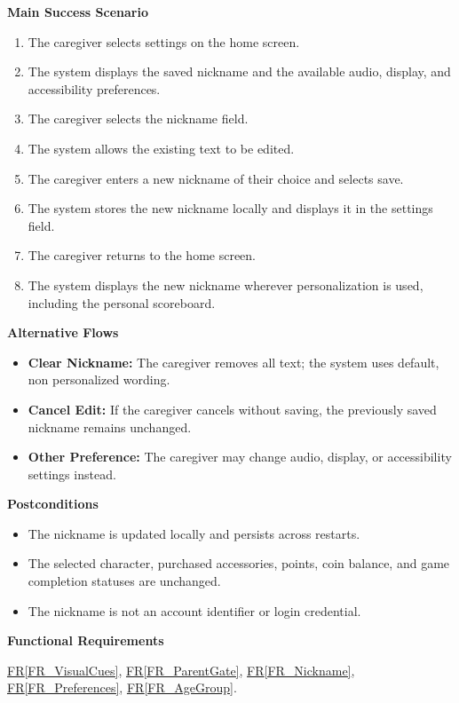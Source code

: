 \documentclass[12pt]{article}
\newcommand{\rref}[1]{\hyperref[#1]{FR\ref*{#1}}}
\begin{document}
\textbf{Main Success Scenario}
\begin{enumerate}
    \item The caregiver selects settings on the home screen.
    \item The system displays the saved nickname and the
    available audio, display, and accessibility preferences.
    \item The caregiver selects the nickname field.
    \item The system allows the existing text to be edited.
    \item The caregiver enters a new nickname of their choice
    and selects save.
    \item The system stores the new nickname locally and
    displays it in the settings field.
    \item The caregiver returns to the home screen.
    \item The system displays the new nickname wherever
    personalization is used, including the personal scoreboard.
\end{enumerate}

\textbf{Alternative Flows}
\begin{itemize}
    \item \textbf{Clear Nickname:} The caregiver removes all text;
    the system uses default, non personalized wording.
    \item \textbf{Cancel Edit:} If the caregiver cancels without saving,
    the previously saved nickname remains unchanged.
    \item \textbf{Other Preference:} The caregiver may change
    audio, display, or accessibility settings instead.
\end{itemize}

\textbf{Postconditions}
\begin{itemize}
    \item The nickname is updated locally and persists across restarts.
    \item The selected character, purchased accessories, points,
    coin balance, and game completion statuses are unchanged.
    \item The nickname is not an account identifier or login credential.
\end{itemize}

\textbf{Functional Requirements}

\rref{FR_VisualCues}, \rref{FR_ParentGate}, \rref{FR_Nickname}, \rref{FR_Preferences}, \rref{FR_AgeGroup}.
\end{document}
